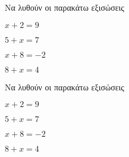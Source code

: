 Να λυθούν οι παρακάτω εξισώσεις
\begin{alist}
\item $ x+2=9 $
\item $ 5+x=7 $
\item $ x+8=-2 $
\item $ 8+x=4 $
\end{alist}
Να λυθούν οι παρακάτω εξισώσεις
\begin{alist}
\item $ x+2=9 $
\item $ 5+x=7 $
\item $ x+8=-2 $
\item $ 8+x=4 $
\end{alist}
